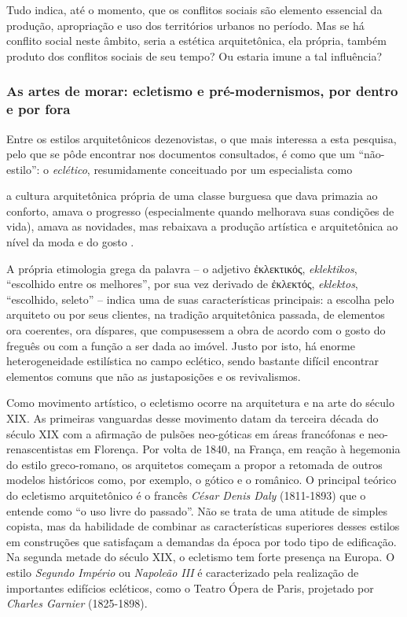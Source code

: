 Tudo indica, até o momento, que os conflitos sociais são elemento essencial da produção, apropriação e uso dos territórios urbanos no período. Mas se há conflito social neste âmbito, seria a estética arquitetônica, ela própria, também produto dos conflitos sociais de seu tempo? Ou estaria imune a tal influência?

\subsubsection{As artes de morar: ecletismo e pré-modernismos, por dentro e por fora}\label{subsec:armor}

Entre os estilos arquitetônicos dezenovistas, o que mais interessa a esta pesquisa, pelo que se pôde encontrar nos documentos consultados, é como que um ``não-estilo'': o \textit{eclético}, resumidamente conceituado por um especialista como

\begin{citacao}
a cultura arquitetônica própria de uma classe burguesa que dava primazia ao conforto, amava o progresso (especialmente quando melhorava suas condições de vida), amava as novidades, mas rebaixava a produção artística e arquitetônica ao nível da moda e do gosto \cite[p.~13]{patetta_ecletismo_1987}.
\end{citacao}

A própria etimologia grega da palavra -- o adjetivo \textgreek{ἐκλεκτικός}, \textit{eklektikos}, ``escolhido entre os melhores'', por sua vez derivado de \textgreek{ἐκλεκτός}, \textit{eklektos}, ``escolhido, seleto'' -- indica uma de suas características principais: a escolha pelo arquiteto ou por seus clientes, na tradição arquitetônica passada, de elementos ora coerentes, ora díspares, que compusessem a obra de acordo com o gosto do freguês ou com a função a ser dada ao imóvel. Justo por isto, há enorme heterogeneidade estilística no campo eclético, sendo bastante difícil encontrar elementos comuns que não as justaposições e os revivalismos. 

Como movimento artístico, o ecletismo ocorre na arquitetura e na arte do século XIX. As primeiras vanguardas desse movimento datam da terceira década do século XIX com a
afirmação de pulsões neo-góticas em áreas francófonas e neo-renascentistas em Florença. Por volta de 1840, na França, em reação à hegemonia do estilo greco-romano, os arquitetos começam a propor a retomada de outros modelos históricos como, por exemplo, o gótico e o românico. O principal teórico do ecletismo arquitetônico é o francês \textit{César Denis Daly} (1811-1893) que o entende como ``o uso livre do passado''. Não se trata de uma atitude de simples copista, mas da habilidade de combinar as características superiores desses estilos em construções que satisfaçam a demandas da época por todo tipo de edificação. Na segunda metade do século XIX, o ecletismo tem forte presença na Europa. O estilo \textit{Segundo Império} ou \textit{Napoleão III} é caracterizado pela realização de importantes edifícios ecléticos, como o Teatro Ópera de Paris, projetado por \textit{Charles Garnier} (1825-1898).

